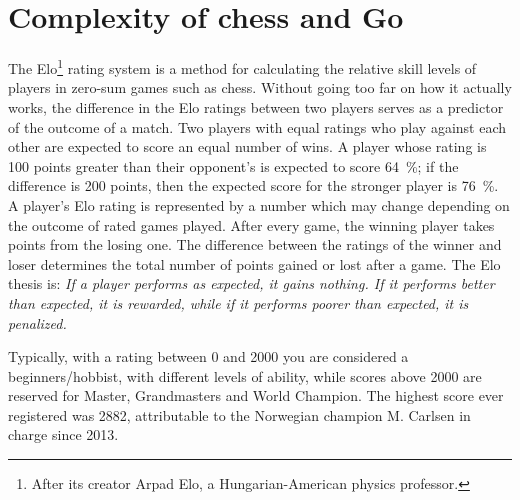 \section{Complexity of chess and Go}
The Elo\footnote{After its creator Arpad Elo, a Hungarian-American physics professor.} rating system is a method for calculating the relative skill levels of players in zero-sum games such as chess. Without going too far on how it actually works, the difference in the Elo ratings between two players serves as a predictor of the outcome of a match. Two players with equal ratings who play against each other are expected to score an equal number of wins. A player whose rating is 100 points greater than their opponent's is expected to score \SI{64}{\percent}; if the difference is 200 points, then the expected score for the stronger player is \SI{76}{\percent}. A player's Elo rating is represented by a number which may change depending on the outcome of rated games played. After every game, the winning player takes points from the losing one. The difference between the ratings of the winner and loser determines the total number of points gained or lost after a game. The Elo thesis is: \emph{If a player performs as expected, it gains nothing. If it performs better than expected, it is rewarded, while if it performs poorer than expected, it is penalized.}

Typically, with a rating between 0 and \num{2000} you are considered a beginners/hobbist, with different levels of ability, while scores above \num{2000} are reserved for Master, Grandmasters and World Champion. The highest score ever registered was \num{2882}, attributable to the Norwegian champion M. Carlsen in charge since 2013.

